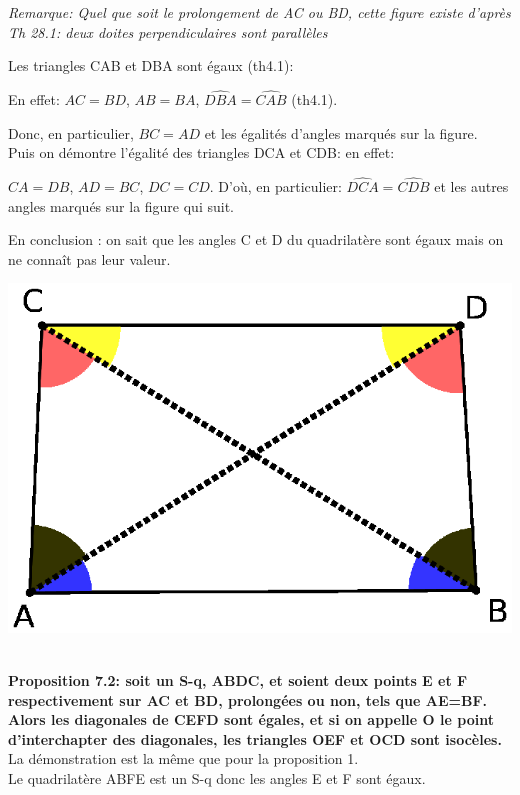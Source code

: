 \documentclass[a4paper, 12pt, twoside]{book}
\begin{document}
\textit{Remarque: Quel que soit le prolongement de AC ou BD, cette figure existe d'après Th 28.1: deux doites perpendiculaires sont parallèles}

Les triangles CAB et DBA sont égaux (th4.1): \
 
En effet: $AC=BD$, $AB=BA$, $\hat{DBA}=\hat{CAB}$ (th4.1).\ 

Donc, en particulier, $BC=AD$ et les égalités d'angles marqués sur la figure.\\




Puis on démontre l'égalité des triangles DCA et CDB: en effet: \

$CA=DB$, $AD=BC$, $DC=CD$. D'où, en particulier: $\hat{DCA}=\hat{CDB}$ et les autres angles marqués sur la figure qui suit.\

En conclusion : on sait que les angles C et D du quadrilatère sont égaux mais on ne connaît pas leur valeur. 

\includegraphics[scale=0.5]{figures/sacc3.eps}\


\textbf{Proposition 7.2: soit un S-q, ABDC, et soient deux points E et F respectivement sur AC et BD, prolongées ou non, tels que AE=BF. Alors les diagonales de CEFD sont égales, et si on appelle O le point d'interchapter des diagonales, les triangles OEF et OCD sont isocèles.  }\\

La démonstration est la même que pour la proposition 1.\\

Le quadrilatère ABFE est un S-q donc les angles E et F sont égaux.\\
\end{document}
